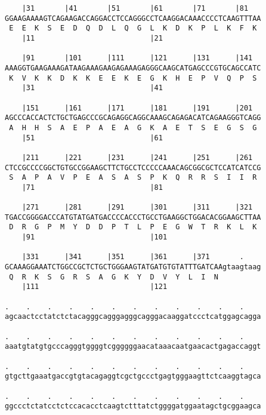 \documentclass{article}
\begin{document}
\begin{Verbatim}
    |31       |41       |51       |61       |71       |81   
GGAAGAAAAGTCAGAAGACCAGGACCTCCAGGGCCTCAAGGACAAACCCCTCAAGTTTAA
 E  E  K  S  E  D  Q  D  L  Q  G  L  K  D  K  P  L  K  F  K 
    |11                           |21                       
  
    |91       |101      |111      |121      |131      |141  
AAAGGTGAAGAAAGATAAGAAAGAAGAGAAAGAGGGCAAGCATGAGCCCGTGCAGCCATC
 K  V  K  K  D  K  K  E  E  K  E  G  K  H  E  P  V  Q  P  S 
    |31                           |41                       
  
    |151      |161      |171      |181      |191      |201  
AGCCCACCACTCTGCTGAGCCCGCAGAGGCAGGCAAAGCAGAGACATCAGAAGGGTCAGG
 A  H  H  S  A  E  P  A  E  A  G  K  A  E  T  S  E  G  S  G 
    |51                           |61                       
  
    |211      |221      |231      |241      |251      |261  
CTCCGCCCCGGCTGTGCCGGAAGCTTCTGCCTCCCCCAAACAGCGGCGCTCCATCATCCG
 S  A  P  A  V  P  E  A  S  A  S  P  K  Q  R  R  S  I  I  R 
    |71                           |81                       
  
    |271      |281      |291      |301      |311      |321  
TGACCGGGGACCCATGTATGATGACCCCACCCTGCCTGAAGGCTGGACACGGAAGCTTAA
 D  R  G  P  M  Y  D  D  P  T  L  P  E  G  W  T  R  K  L  K 
    |91                           |101                      
  
    |331      |341      |351      |361      |371       .    
GCAAAGGAAATCTGGCCGCTCTGCTGGGAAGTATGATGTGTATTTGATCAAgtaagtaag
 Q  R  K  S  G  R  S  A  G  K  Y  D  V  Y  L  I  N          
    |111                          |121                      
  
.    .    .    .    .    .    .    .    .    .    .    .    
agcaactcctatctctacagggcagggagggcagggacaaggatccctcatggagcagga
                                                            
.    .    .    .    .    .    .    .    .    .    .    .    
aaatgtatgtgcccagggtggggtcggggggaacataaacaatgaacactgagaccaggt
                                                            
.    .    .    .    .    .    .    .    .    .    .    .    
gtgcttgaaatgaccgtgtacagaggtcgctgccctgagtgggaagttctcaaggtagca
                                                            
.    .    .    .    .    .    .    .    .    .    .    .    
ggccctctatcctctccacacctcaagtctttatctggggatggaatagctgcggaagca
                                                            

\end{Verbatim}
\end{document}
